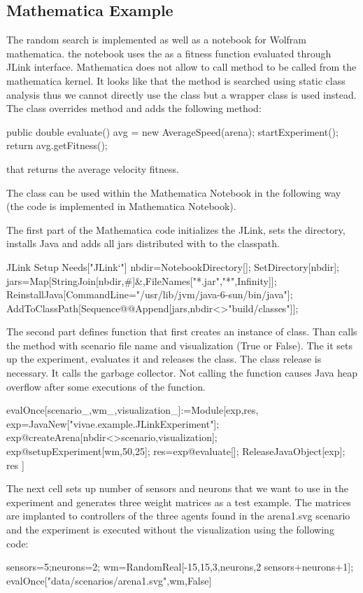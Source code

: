 \subsection{Mathematica Example}

The random search is implemented as well as a notebook for Wolfram mathematica. the notebook uses the \vivae as a fitness function evaluated through JLink interface. Mathematica does not allow to call  method to be called from the mathematica kernel. It looks like that the method is searched using static class analysis thus we cannot directly use the  class but a wrapper  class is used instead. The class overrides  method and adds the following  method:
\begin{colorverbatim}
public double evaluate(){
    avg = new AverageSpeed(arena);
    startExperiment();
    return avg.getFitness();
}
\end{colorverbatim}
that returns the average velocity fitness.

The class can be used within the Mathematica Notebook in the following way (the code is implemented in  Mathematica Notebook).

The first part of the Mathematica code initializes the JLink, sets the directory, installs Java and adds all jars distributed with \vivae to the classpath.
\begin{colorverbatim}
JLink Setup
Needs["JLink`"]
nbdir=NotebookDirectory[];
SetDirectory[nbdir];
jars=Map[StringJoin[nbdir,#]&,FileNames["*.jar",{"*"},Infinity]];
ReinstallJava[CommandLine="/usr/lib/jvm/java-6-sun/bin/java"];
AddToClassPath[Sequence@@Append[jars,nbdir<>"build/classes"]];
\end{colorverbatim}

The second part defines  function that first creates an instance of  class. Than calls the  method with scenario file name and visualization (True or False). The it sets up the experiment, evaluates it and releases the class. The class release is necessary. It calls the garbage collector. Not calling the  function causes Java heap overflow after some executions of the  function.
\begin{colorverbatim}
evalOnce[scenario_,wm_,visualization_]:=Module[{exp,res},
    exp=JavaNew["vivae.example.JLinkExperiment"];
    exp@createArena[nbdir<>scenario,visualization];
    exp@setupExperiment[wm,50,25];
    res=exp@evaluate[];
    ReleaseJavaObject[exp];
    res
]
\end{colorverbatim}
The next cell sets up number of sensors and neurons that we want to use in the experiment and generates three weight matrices as a test example. The matrices are implanted to controllers of the three agents found in the arena1.svg scenario and the experiment is executed without the visualization using the following code:
\begin{colorverbatim}
sensors=5;neurons=2;
wm=RandomReal[{-15,15},{3,neurons,2 sensors+neurons+1}];
evalOnce["data/scenarios/arena1.svg",wm,False]
\end{colorverbatim}

